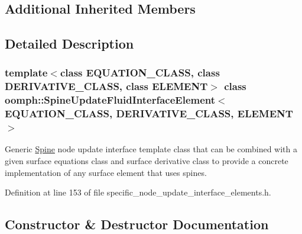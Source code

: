 \subsection*{Additional Inherited Members}


\subsection{Detailed Description}
\subsubsection*{template$<$class E\+Q\+U\+A\+T\+I\+O\+N\+\_\+\+C\+L\+A\+SS, class D\+E\+R\+I\+V\+A\+T\+I\+V\+E\+\_\+\+C\+L\+A\+SS, class E\+L\+E\+M\+E\+NT$>$\newline
class oomph\+::\+Spine\+Update\+Fluid\+Interface\+Element$<$ E\+Q\+U\+A\+T\+I\+O\+N\+\_\+\+C\+L\+A\+S\+S, D\+E\+R\+I\+V\+A\+T\+I\+V\+E\+\_\+\+C\+L\+A\+S\+S, E\+L\+E\+M\+E\+N\+T $>$}

Generic \hyperlink{classoomph_1_1Spine}{Spine} node update interface template class that can be combined with a given surface equations class and surface derivative class to provide a concrete implementation of any surface element that uses spines. 

Definition at line 153 of file specific\+\_\+node\+\_\+update\+\_\+interface\+\_\+elements.\+h.



\subsection{Constructor \& Destructor Documentation}
\mbox{\label{classoomph_1_1SpineUpdateFluidInterfaceElement_a2cc44705997f9fb44abf56ddb5f0cde0}} 
